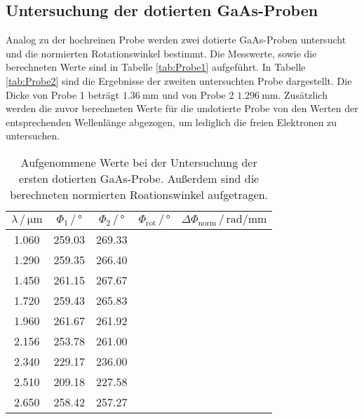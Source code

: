    \subsection{Untersuchung der dotierten GaAs-Proben}
   Analog zu der hochreinen Probe werden zwei dotierte GaAs-Proben untersucht und die normierten Rotationswinkel 
   bestimmt. Die Messwerte, sowie die berechneten Werte sind in Tabelle \ref{tab:Probe1} aufgeführt. 
   In Tabelle \ref{tab:Probe2} sind die Ergebnisse der zweiten untersuchten Probe dargestellt. Die Dicke 
   von Probe 1 beträgt $\SI{1.36}{\milli\meter}$ und von Probe 2 $\SI{1.296}{\milli\meter}$. Zusätzlich 
   werden die zuvor berechneten Werte für die undotierte Probe von den Werten der entsprechenden Wellenlänge 
   abgezogen, um lediglich die freien Elektronen zu untersuchen.
   \begin{table}[H]
    \centering
    \caption{Aufgenommene Werte bei der Untersuchung der ersten dotierten GaAs-Probe. Außerdem sind die 
    berechneten normierten Roationswinkel aufgetragen.}
    \label{tab:tab:Probe1}
    \begin{tabular}{ccccc}
      \toprule
      $\lambda\, / \, \si{\micro\meter}$ & $\Phi_1 \, / \, \si{\degree}$ & $\Phi_2 \, / \, \si{\degree}$ & $\Phi_\text{rot} \, / \, \si{\degree}$ & $\Delta\Phi_\text{norm} \, / \, \si{\radian\per\milli\meter}$  \\
      \midrule
      1.060 & 259.03 & 269.33 &  &  \\
      1.290 & 259.35 & 266.40 &  &  \\
      1.450 & 261.15 & 267.67 &  &  \\
      1.720 & 259.43 & 265.83 &  &  \\
      1.960 & 261.67 & 261.92 &  &  \\
      2.156 & 253.78 & 261.00 &  &  \\
      2.340 & 229.17 & 236.00 &  &  \\
      2.510 & 209.18 & 227.58 &  &  \\
      2.650 & 258.42 & 257.27 &  &  \\
      \bottomrule
    \end{tabular}
   \end{table} \noindent



